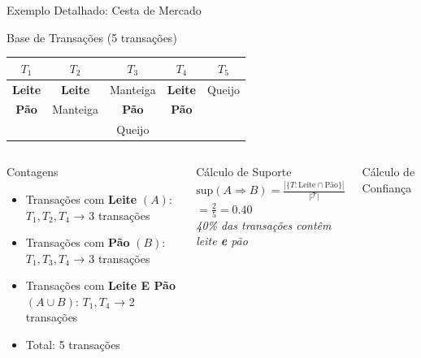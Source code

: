 \documentclass[aspectratio=169]{beamer}
\begin{document}
\begin{frame}[shrink=3]{Exemplo Detalhado: Cesta de Mercado}
    \begin{block}{Base de Transações (5 transações)}
        \begin{center}\footnotesize
        \begin{tabular}{ccccc}
        \toprule
        $T_1$ & $T_2$ & $T_3$ & $T_4$ & $T_5$ \\
        \midrule
        \textcolor{mineblue}{\textbf{Leite}} & \textcolor{mineblue}{\textbf{Leite}} & Manteiga & \textcolor{mineblue}{\textbf{Leite}} & Queijo \\
        \textcolor{mineorange}{\textbf{Pão}} & Manteiga & \textcolor{mineorange}{\textbf{Pão}} & \textcolor{mineorange}{\textbf{Pão}} & \\
        & & Queijo & & \\
        \bottomrule
        \end{tabular}
        \end{center}
    \end{block}
    \pause
    \begin{columns}
        \begin{block}{Contagens}
            \footnotesize
            \begin{itemize}
                \item Transações com \textbf{Leite} $(A)$: $T_1, T_2, T_4$ → 3 transações
                \item Transações com \textbf{Pão} $(B)$: $T_1, T_3, T_4$ → 3 transações
                \item Transações com \textbf{Leite E Pão} $(A \cup B)$: $T_1, T_4$ → 2 transações
                \item Total: 5 transações
            \end{itemize}
        \end{block}
        \pause
        \begin{block}{Cálculo de Suporte}
            \footnotesize
            $\text{sup}(A \Rightarrow B) = \frac{|\{T: \text{Leite} \cap \text{Pão}\}|}{|\mathcal{T}|}$\\[6pt]
            $= \frac{2}{5} = \boxed{0{.}40}$\\[6pt]
            \textit{40\% das transações contêm leite \textbf{e} pão}
        \end{block}
        \pause
        \begin{block}{Cálculo de Confiança}

\end{block}
\end{columns}
\end{frame}
\end{document}

